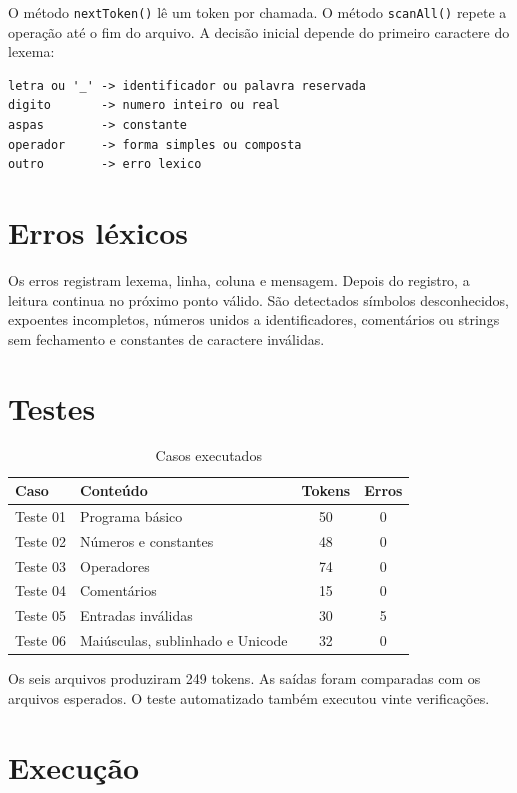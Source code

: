 \documentclass[12pt,a4paper]{article}
\begin{document}
O método \texttt{nextToken()} lê um token por chamada. O método \texttt{scanAll()} repete a operação até o fim do arquivo. A decisão inicial depende do primeiro caractere do lexema:

\begin{lstlisting}
letra ou '_' -> identificador ou palavra reservada
digito       -> numero inteiro ou real
aspas        -> constante
operador     -> forma simples ou composta
outro        -> erro lexico
\end{lstlisting}

\section{Erros léxicos}

Os erros registram lexema, linha, coluna e mensagem. Depois do registro, a leitura continua no próximo ponto válido. São detectados símbolos desconhecidos, expoentes incompletos, números unidos a identificadores, comentários ou strings sem fechamento e constantes de caractere inválidas.

\section{Testes}

\begin{table}[H]
\centering
\caption{Casos executados}
\small
\begin{tabularx}{\textwidth}{p{2cm}Y c c}
\toprule
\textbf{Caso} & \textbf{Conteúdo} & \textbf{Tokens} & \textbf{Erros} \\
\midrule
Teste 01 & Programa básico & 50 & 0 \\
Teste 02 & Números e constantes & 48 & 0 \\
Teste 03 & Operadores & 74 & 0 \\
Teste 04 & Comentários & 15 & 0 \\
Teste 05 & Entradas inválidas & 30 & 5 \\
Teste 06 & Maiúsculas, sublinhado e Unicode & 32 & 0 \\
\bottomrule
\end{tabularx}
\end{table}

Os seis arquivos produziram 249 tokens. As saídas foram comparadas com os arquivos esperados. O teste automatizado também executou vinte verificações.

\section{Execução}
\end{document}
